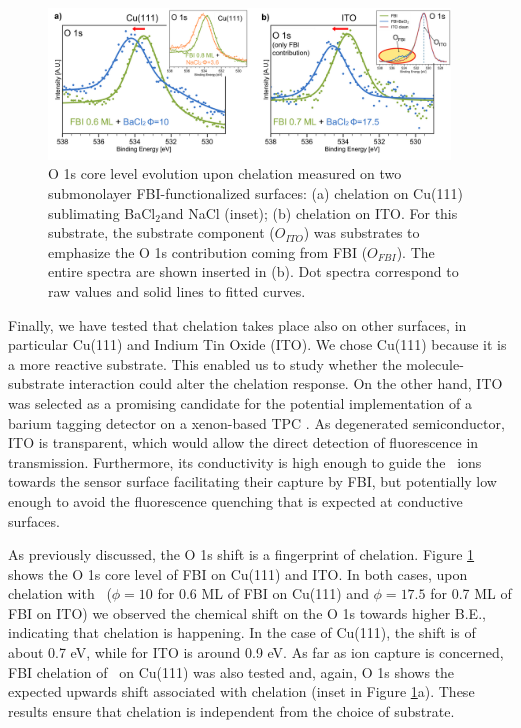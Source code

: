 \documentclass[aps,prl,reprint,longbibliography,superscriptaddress, english]{revtex4-1}
\def\BappCl{BaCl$_2$}
\begin{document}
\begin{figure}[ht!]
	\includegraphics[width=0.95\textwidth]{figures/Figure_5.png}
	\caption{\label{XPS_FBI_Cu_ITO} 
    O 1s core level evolution upon chelation measured on two submonolayer FBI-functionalized surfaces: (a) chelation on Cu(111) sublimating \BappCl and NaCl (inset); (b) chelation on ITO. For this substrate, the substrate component (${O_{ITO}}$) was substrates to emphasize the O 1s contribution coming from FBI (${O_{FBI}}$). The entire spectra are shown inserted in (b). Dot spectra correspond to raw values and solid lines to fitted curves.}
\end{figure} 

Finally, we have tested that chelation takes place also on other surfaces, in particular Cu(111) and Indium Tin Oxide (ITO). We chose Cu(111) because it is a more reactive substrate. This enabled us to study whether the molecule-substrate interaction could alter the chelation response. On the other hand, ITO was selected as a promising candidate for the potential implementation of a barium tagging detector on a xenon-based TPC \cite{rivilla_fluorescent_2020}. As degenerated semiconductor, ITO is transparent, which would allow the direct detection of fluorescence in transmission. Furthermore, its conductivity is high enough to guide the \Bapp\ ions towards the sensor surface facilitating their capture by FBI, but potentially low enough to avoid the fluorescence quenching that is expected at conductive surfaces.

As previously discussed, the O 1s shift is a fingerprint of chelation. Figure \ref{XPS_FBI_Cu_ITO} shows the O 1s core level of FBI on Cu(111) and ITO. In both cases, upon chelation with \Bapp\ ($\phi = 10$ for 0.6 ML of FBI on Cu(111) and $\phi = 17.5$ for 0.7 ML of FBI on ITO) we observed the chemical shift on the O 1s towards higher B.E., indicating that chelation is happening. In the case of Cu(111), the shift is of about 0.7 eV, while for ITO is around 0.9 eV. As far as ion capture is concerned, FBI chelation of \Nap\  on Cu(111) was also tested and, again, O 1s shows the expected upwards shift associated with chelation (inset in Figure \ref{XPS_FBI_Cu_ITO}a). These results ensure that chelation is independent from the choice of substrate.
\end{document}
